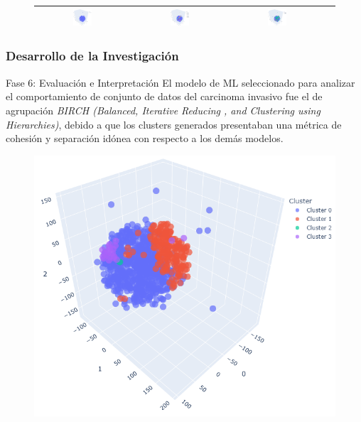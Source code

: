 \documentclass[xcolor=dvipsnames,xcolor=table,10pt]{beamer} %
\begin{document}
\begin{frame}
\begin{figure}
\begin{tabular}{|c|c|c|c|}
			\includegraphics[width=0.21\textwidth]{IMAGENES/CLUSTERING/6_TNSE_Density_Based_Spatial_Clustering} &
			\includegraphics[width=0.21\textwidth]{IMAGENES/CLUSTERING/7_TNSE_OPTICS_Clustering} &
			\includegraphics[width=0.21\textwidth]{IMAGENES/CLUSTERING/9_TNSE_Kmodes} 
			\\ \hline
		\end{tabular}
	\end{figure}
\end{frame}

\begin{frame}
	\frametitle{Desarrollo de la Investigación}
	\begin{block}{Fase 6: Evaluación e Interpretación}\justifying
	El modelo de ML seleccionado para analizar el comportamiento de conjunto de datos del carcinoma invasivo fue el de agrupación \textit{BIRCH (Balanced, Iterative Reducing , and Clustering using Hierarchies)}, debido a que  los clusters generados presentaban una métrica de cohesión y separación idónea con respecto a los demás modelos.
	\end{block}
	
	\begin{figure}[h!]
		\centering
		\includegraphics[width=0.45\linewidth]{IMAGENES/CLUSTERING/8_TNSE_Birch_Clustering}
	\end{figure}
\end{frame}
\end{document}
